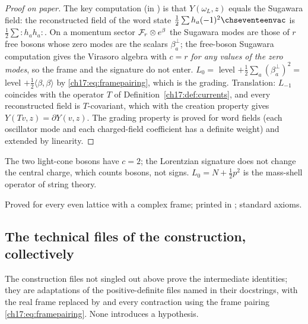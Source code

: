 \begin{proof}[Proof on paper]
The key computation (in ) is that $Y(\omega_L,z)$ equals the
Sugawara field: the reconstructed field of the word state $\frac12\sum h_a(-1)^2\chseventeenvac$ is
$\frac12\sum{:}h_ah_a{:}$.  On a momentum sector $\mathcal{F}_r\otimes e^\beta$ the Sugawara modes are those of $r$
free bosons whose zero modes are the scalars $\beta^\perp_a$; the free-boson Sugawara computation gives the Virasoro
algebra with $c=r$ \emph{for any values of the zero modes}, so the frame and the signature do not enter.
$L_0=$ level $+\frac12\sum_a(\beta^\perp_a)^2=$ level $+\frac12\langle\beta,\beta\rangle$ by \eqref{ch17:eq:framepairing}, which is
the grading.  Translation: $L_{-1}$ coincides with the operator $T$ of Definition~\ref{ch17:def:currents}, and
every reconstructed field is $T$-covariant, which with the creation property gives $Y(Tv,z)=\partial Y(v,z)$.
The grading property is proved for word fields (each oscillator mode and each charged-field coefficient has a
definite weight) and extended by linearity.
\end{proof}

\begin{physics}
The two light-cone bosons have $c=2$; the Lorentzian signature does not change the central charge, which
counts bosons, not signs.  $L_0=N+\frac12p^2$ is the mass-shell operator of string theory.
\end{physics}

\begin{status}
Proved for every even lattice with a complex frame; printed in
; standard axioms.
\end{status}

\subsection{The technical files of the construction, collectively}

The construction files not singled out above prove the intermediate identities; they are adaptations of the
positive-definite files named in their docstrings, with the real frame replaced by 
and every contraction using the frame pairing \eqref{ch17:eq:framepairing}.  None introduces a hypothesis.

